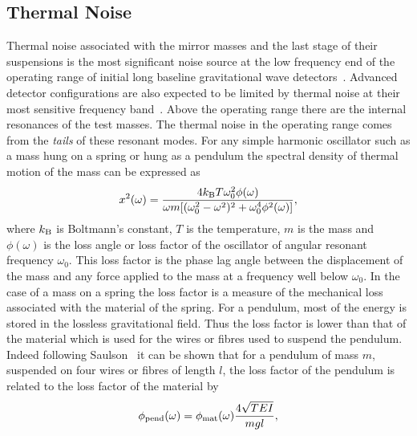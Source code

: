 \documentclass{article}
\begin{document}

\subsection{Thermal Noise}
\label{subsection:thermal}

Thermal noise associated with the mirror masses and the last stage of
their suspensions is the most significant noise source at
the low frequency end of the operating range of initial long baseline
gravitational wave detectors~\cite{Saulson2}. Advanced detector configurations
are also expected to be limited by thermal noise at their most sensitive frequency
band~\cite{Levin,Nakagawa:2002,Harry:2002,Crooks:2002}. Above the operating range
there are the internal resonances of the test masses. The
thermal noise in the operating range comes from the {\em tails} of
these resonant modes. For any simple harmonic oscillator such as a
mass hung on a spring or hung as a pendulum the spectral density of
thermal motion of the mass can be expressed as~\cite{Saulson2}
%
\begin{equation}
  x^{2}(\omega) = \frac{4 k_{\rm B} T \omega_{0}^{2}
  \phi(\omega)}{\omega m [{(\omega_{0}^{2} - \omega^{2})^2 +
  \omega_{0}^{4} \phi^{2}(\omega)}]},
  \label{equation:thnoise}
\end{equation}
%
where $k_{\rm B}$ is Boltmann's constant, $T$ is the temperature, $m$
is the mass and  $\phi(\omega)$ is the loss angle or loss factor of the
oscillator of angular resonant frequency $\omega_0$.
This loss factor is the phase lag angle between the displacement of the
mass and any force applied to the mass at a frequency well below $\omega_0$.
In the case of a mass on a spring the loss factor is a measure of the
mechanical loss associated with the material of the spring. For a
pendulum, most of the energy is stored in the lossless gravitational
field. Thus the loss factor is lower than that of the material which
is used for the wires or fibres used to suspend the pendulum. Indeed
following Saulson~\cite{Saulson2} it can be shown that for a pendulum
of mass $m$, suspended on four wires or fibres of length $l$, the loss
factor of the pendulum is related to the loss factor of the material
by
%
\begin{equation}
  \phi_{\rm pend}(\omega) = \phi_{\rm mat}(\omega)\frac{4
  \sqrt{TEI}}{mgl},
  \label{equation:pend}
\end{equation}
\end{document}
